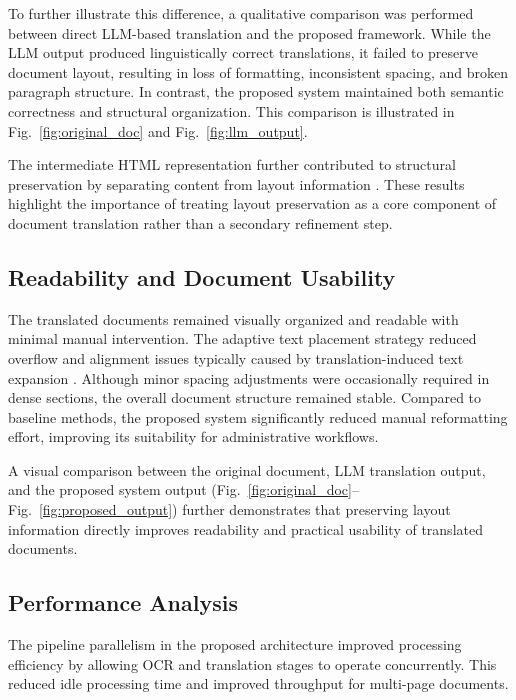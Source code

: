 \documentclass[11pt]{article}
\begin{document}
To further illustrate this difference, a qualitative comparison was performed between direct LLM-based translation and the proposed framework. While the LLM output produced linguistically correct translations, it failed to preserve document layout, resulting in loss of formatting, inconsistent spacing, and broken paragraph structure. In contrast, the proposed system maintained both semantic correctness and structural organization. This comparison is illustrated in Fig.~\ref{fig:original_doc} and Fig.~\ref{fig:llm_output}.

The intermediate HTML representation further contributed to structural preservation by separating content from layout information \cite{xu_layoutlm:_2020,xu_layoutlmv2:_2022,huang_layoutlmv3:_2022,appalaraju_docformer:_2021}. These results highlight the importance of treating layout preservation as a core component of document translation rather than a secondary refinement step.

\subsection{Readability and Document Usability}

The translated documents remained visually organized and readable with minimal manual intervention. The adaptive text placement strategy reduced overflow and alignment issues typically caused by translation-induced text expansion \cite{xu_layoutlm:_2020,xu_layoutlmv2:_2022,huang_layoutlmv3:_2022}.
Although minor spacing adjustments were occasionally required in dense sections, the overall document structure remained stable. Compared to baseline methods, the proposed system significantly reduced manual reformatting effort, improving its suitability for administrative workflows.

A visual comparison between the original document, LLM translation output, and the proposed system output (Fig.~\ref{fig:original_doc}–Fig.~\ref{fig:proposed_output}) further demonstrates that preserving layout information directly improves readability and practical usability of translated documents.

\subsection{Performance Analysis}

The pipeline parallelism in the proposed architecture improved processing efficiency by allowing OCR and translation stages to operate concurrently. This reduced idle processing time and improved throughput for multi-page documents.
\end{document}
